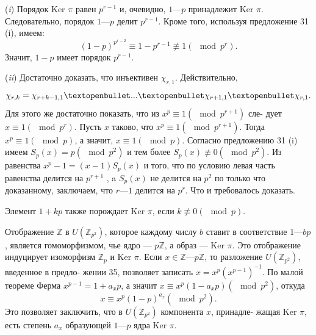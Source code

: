 \documentclass{../template/mai_book}
\begin{document}
\begin{myproof}
 
\par  (\textit{i}) Порядок $\text{Ker }\pi$ равен $p^{r-1}$ и, очевидно, $1 — p$ принадлежит $\text{Ker }\pi$.\linebreak
Следовательно, порядок $1 — p$ делит $p^{r - 1}$. Кроме того, используя\linebreak
предложение 31 (i), имеем:
$$(1-p)^{p^{r-2}}\equiv 1 - p^{r-1} \not\equiv 1 (\mod p^r).$$
Значит, $1 - p$ имеет порядок $p^{r-1}$.
\par  (\textit{ii}) Достаточно доказать, что инъективен $\chi_{r,1}$. Действительно,\linebreak
$$\chi_{r,k} = \chi_{r+k-1,1}\textopenbullet...\textopenbullet\chi_{r+1,1}\textopenbullet\chi_{r,1}.$$
Для этого же достаточно показать, что из $x^p \equiv 1 (\mod p^{r+1})$ сле­-\linebreak
дует $x \equiv 1 (\mod p^r)$. Пусть $x$ таково, что $x^p \equiv 1(\mod p^{r + 1})$. Тогда\linebreak
$x^p \equiv 1 (\mod p)$, а значит, $x \equiv 1 (\mod p)$. Согласно предложению 31\linebreak
(i) имеем $S_p(x) = p (\mod p^2 )$ и тем более $S_p (x) \not\equiv 0 (\mod p^2 )$. Из\linebreak
равенства $x^p -1 = (x - 1)S_p(x)$ и того, что по условию левая часть\linebreak
равенства делится на $p^{r + 1}$ , a $S_p(x)$ не делится на $p^2$ по только что
доказанному, заключаем, что $r —1$ делится на $p^r$. Что и требовалось
доказать.
\end{myproof}
\begin{mynotice}
Элемент $1 + kp$ также порождает $\text{Ker }\pi$, если $k \not\equiv 0$\linebreak $(\mod p)$.

Отображение $\mathbb{Z}$ в $U(
\mathbb{Z}_{p^2})$, которое каждому числу $b$ ставит в\linebreak
соответствие $1 — bp$, является гомоморфизмом, чье ядро — $p\mathbb{Z}$, а\linebreak
образ — $\text{Ker }\pi$. Это отображение индуцирует изоморфизм $\mathbb{Z}_p$ и\linebreak
$\text{Ker }\pi$. Если $x \in \mathbb{Z} — p\mathbb{Z}$, то разложение $U(\mathbb{Z}_{p^2})$, введенное в предло­-\linebreak
жении 35, позволяет записать $x = x^p(x^{p-1})^{-1}$. По малой теореме\linebreak
Ферма 
$x^{p-1}=1+a_xp$, а значит $x \equiv x^p(1-a_xp) (\mod p^2)$, откуда\linebreak
$$x \equiv x^p(1-p)^{a_x}(\mod p^2).$$
Это позволяет заключить, что в $U(\mathbb{Z}_{p^2})$ компонента $x$, принадле-\linebreak­
жащая $\text{Ker }\pi$, есть степень $a_x$ образующей $1 — p$ ядра $\text{Ker }\pi$.
\end{mynotice}
\end{document}
